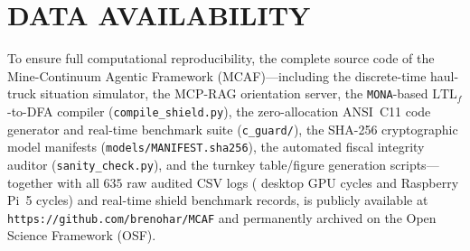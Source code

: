 \documentclass{ieeeaccess}
\begin{document}
\section*{DATA AVAILABILITY}
To ensure full computational reproducibility, the complete source code of the Mine-Continuum Agentic Framework (MCAF)---including the discrete-time haul-truck situation simulator, the MCP-RAG orientation server, the \texttt{MONA}-based $\mathrm{LTL}_f$-to-DFA compiler (\texttt{compile\_shield.py}), the zero-allocation ANSI~C11 code generator and real-time benchmark suite (\texttt{c\_guard/}), the SHA-256 cryptographic model manifests (\texttt{models/MANIFEST.sha256}), the automated fiscal integrity auditor (\texttt{sanity\_check.py}), and the turnkey table/figure generation scripts---together with all $635$ raw audited CSV logs ({\TotalDesktopCycles} desktop GPU cycles and {\TotalPiCycles} Raspberry Pi~5 cycles) and {\TotalCShieldCycles} real-time shield benchmark records, is publicly available at \texttt{https://github.com/brenohar/MCAF} and permanently archived on the Open Science Framework (OSF).
\end{document}
